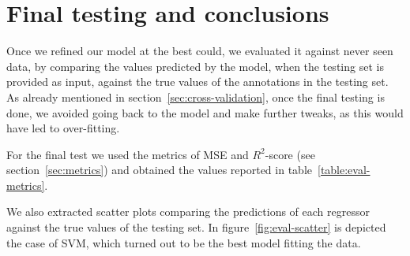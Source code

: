 \section{Final testing and conclusions}

Once we refined our model at the best could, we evaluated it against never seen data, by comparing the values predicted by the model, when the testing set is provided as input, against the true values of the annotations in the testing set. As already mentioned in section~\ref{sec:cross-validation}, once the final testing is done, we avoided going back to the model and make further tweaks, as this would have led to over-fitting.

For the final test we used the metrics of MSE and $R^2$-score (see section~\ref{sec:metrics}) and obtained the values reported in table~\ref{table:eval-metrics}. 

\begin{table}[b]
	\centering
	\caption{Evaluation metrics}
	\label{table:eval-metrics}
\end{table}

We also extracted scatter plots comparing the predictions of each regressor against the true values of the testing set. In  figure~\ref{fig:eval-scatter} is depicted the case of SVM, which turned out to be the best model fitting the data.

